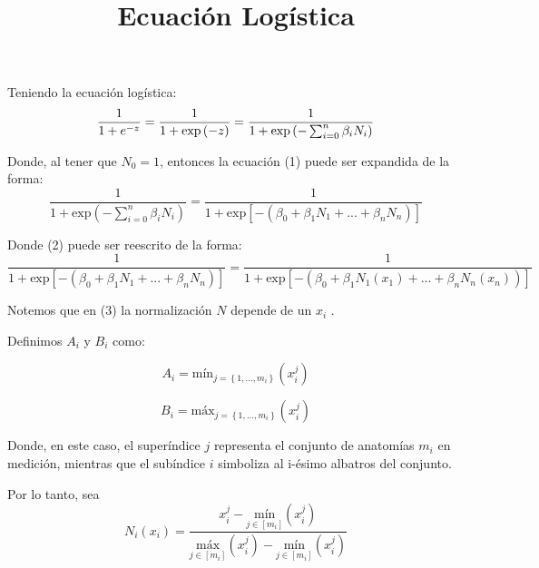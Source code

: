 \documentclass{article}
\begin{document}
\title{Ecuación Logística}
\maketitle
Teniendo la ecuación logística:
\begin{equation}
    \label{simple_equation}
    \frac{1}{1+e^{-z}} = \frac{1}{1+\mbox{\mbox{exp}}\left ( -z\right )} = \frac{1}{1+\mbox{\mbox{exp}}\left (-\sum_{i=0}^{n} \beta _{i}N_{i} \right )}
\end{equation}

Donde, al tener que $N_{0}=1$, entonces la ecuación (1) puede ser expandida de la forma:
\begin{equation}
    \label{simple_equation}
    \frac{1}{1+\mbox{exp}\left (-\sum_{i=0}^{n} \beta _{i}N_{i} \right )} = \frac{1}{1+\mbox{exp}\left [ -\left ( \beta _{0} + \beta _{1}N_{1}+...+\beta_{n}N_{n} \right ) \right ]}
\end{equation}

Donde (2) puede ser reescrito de la forma:
\begin{equation}
    \label{simple_equiation}    
    \frac{1}{1+\mbox{exp}\left [ -\left ( \beta _{0} + \beta _{1}N_{1}+...+\beta_{n}N_{n} \right ) \right ]} = \frac{1}{1+\mbox{exp}\left [ -\left ( \beta _{0} + \beta _{1}N_{1}(x_{1})+...+\beta_{n}N_{n} (x_{n})\right ) \right ]}
\end{equation}

Notemos que en (3) la normalización $N$ depende de un $x_{i}$ .

Definimos $A_{i}$ y $B_{i}$ como:

\begin{equation}
    \label{simple_equiation}
    A_{i}= \mbox{mín}_{j=\left \{ 1,...,m_{i} \right \}}\left ( x_{i}^{j} \right )
\end{equation}

\begin{equation}
    \label{simple_equiation}
    B_{i}= \mbox{máx}_{j=\left \{ 1,...,m_{i} \right \}}\left ( x_{i}^{j} \right )
\end{equation}

Donde, en este caso, el superíndice $j$ representa el conjunto de anatomías $m_i$  en medición, mientras que el subíndice $i$ simboliza al i-ésimo albatros del conjunto.


Por lo tanto, sea 
\begin{equation} N_{i} \left ( x_{i} \right )= \frac{x_{i}^{j} - \underset{j\in [m_{i} ]}{\mbox{mín}}\left (  x_{i}^{j}\right )}{\underset{j\in [m_{i} ]}{\mbox{máx}}\left (  x_{i}^{j}\right )-\underset{j\in [m_{i} ]}{\mbox{mín}}\left (  x_{i}^{j}\right )}
\end{equation}
\end{document}
